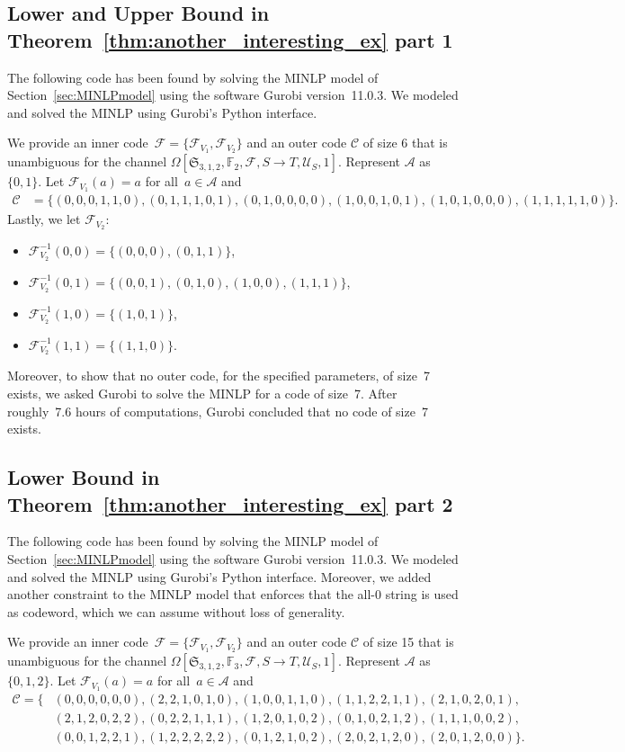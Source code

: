 \documentclass[11pt,a4paper]{article}
\theoremstyle{definition}
\newcommand{\numberset}{\mathds}
\newcommand{\F}{\numberset{F}}
\newcommand{\mC}{\mathcal{C}}
\newcommand{\mA}{\mathcal{A}}
\newcommand{\mF}{\mathcal{F}}
\newcommand{\mU}{\mathcal{U}}
\begin{document}
\subsection{Lower and Upper Bound in Theorem~\ref{thm:another_interesting_ex} part 1}

The following code has been found by solving the MINLP model of Section~\ref{sec:MINLPmodel} using the software Gurobi version~11.0.3. 
We modeled and solved the MINLP using Gurobi's Python interface.

We provide an inner code~$\mF= \{\mF_{V_1},\mF_{V_2}\}$ and an outer code $\mC$ of size 6 that is
unambiguous for the channel $\Omega[\mathfrak{S}_{3,1,2},\F_2,\mF,S \to T,\mU_S,1]$. Represent $\mA$ as $\{0,1\}$. Let $\mF_{V_1}(a)=a$ for all~$a \in \mA$ and 
\begin{align*}
\mC &=\{(0,0,0,1,1,0),(0,1,1,1,0,1),(0,1,0,0,0,0),(1,0,0,1,0,1),(1,0,1,0,0,0),(1,1,1,1,1,0)\}.
\end{align*}
Lastly, we let $\mF_{V_2}$:
\begin{itemize}
    \item $\mF_{V_2}^{-1}(0,0) = \{(0,0,0), (0,1,1)\}$,
    \item $\mF_{V_2}^{-1}(0,1) = \{(0,0,1), (0,1,0), (1,0,0), (1,1,1)\}$,
    \item $\mF_{V_2}^{-1}(1,0) = \{(1,0,1)\}$,
    \item $\mF_{V_2}^{-1}(1,1) = \{(1,1,0)\}$.
    \end{itemize}

Moreover, to show that no outer code, for the specified parameters, of size~7 exists, we asked Gurobi to solve the MINLP for a code of size~7.
After roughly~7.6 hours of computations, Gurobi concluded that no code of size~7 exists.


\subsection{Lower Bound in Theorem~\ref{thm:another_interesting_ex} part 2}

The following code has been found by solving the MINLP model of Section~\ref{sec:MINLPmodel} using the software Gurobi version~11.0.3. 
We modeled and solved the MINLP using Gurobi's Python interface.
Moreover, we added another constraint to the MINLP model that enforces that the all-0 string is used as codeword, which we can assume without loss of generality.

We provide an inner code~$\mF= \{\mF_{V_1},\mF_{V_2}\}$ and an outer code $\mC$ of size 15 that is
unambiguous for the channel $\Omega[\mathfrak{S}_{3,1,2},\F_3,\mF,S \to T,\mU_S,1]$. Represent $\mA$ as $\{0,1,2\}$. Let $\mF_{V_1}(a)=a$ for all~$a \in \mA$ and 
\begin{align*}
\mC =\{&
(0,0,0,0,0,0),
(2,2,1,0,1,0),
(1,0,0,1,1,0),
(1,1,2,2,1,1),
(2,1,0,2,0,1),\\
&(2,1,2,0,2,2),
(0,2,2,1,1,1),
(1,2,0,1,0,2),
(0,1,0,2,1,2),
(1,1,1,0,0,2),\\
&(0,0,1,2,2,1),
(1,2,2,2,2,2),
(0,1,2,1,0,2),
(2,0,2,1,2,0),
(2,0,1,2,0,0)
\}.
\end{align*}
\end{document}
